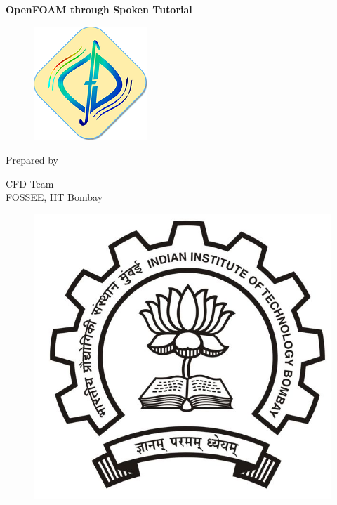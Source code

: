 \documentclass[a4paper,12pt]{report}
\begin{document}
\begin{titlepage}
\begin{center}\bf  \end{center}
\begin{center}\bf \huge OpenFOAM through Spoken Tutorial\end{center}
\vspace{0.2in}
\begin{center}\bf \end{center}
\vspace{0.05in}
\begin{figure}[h]  
\begin{center}  
\includegraphics[scale=0.8]{logo.png}
\end{center}  
\end{figure} 
\begin{center}\bf \end{center}
\begin{center}Prepared by\end{center}
\begin{center} CFD Team \\FOSSEE, IIT Bombay \end{center}
\begin{center}\end{center}
\begin{figure}[h]  
\begin{center}  
\includegraphics[scale=0.8]{image1.jpg}

\end{center}
\end{figure}
\end{titlepage}
\end{document}
